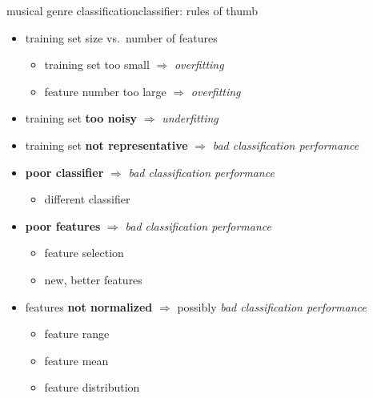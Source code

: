         \begin{frame}{musical genre classification}{classifier: rules of thumb}
            \begin{itemize}
                \item	training set size vs.\ number of features
                    \begin{itemize}
                        \item	training set too small $\Rightarrow$ \textit{overfitting}
                        \item	feature number too large $\Rightarrow$ \textit{overfitting}
                    \end{itemize}
                \item<2->	training set \textbf{too noisy} $\Rightarrow$ \textit{underfitting}
                \item<3->	training set \textbf{not representative} $\Rightarrow$ \textit{bad classification performance}
                \item<4->	\textbf{poor classifier} $\Rightarrow$ \textit{bad classification performance}
                    \begin{itemize}
                        \item	different classifier
                    \end{itemize}
                \item<5->	\textbf{poor features} $\Rightarrow$ \textit{bad classification performance}
                    \begin{itemize}
                        \item	feature selection
                        \item	new, better features
                    \end{itemize}
                \item<6->	features \textbf{not normalized} $\Rightarrow$ possibly \textit{bad classification performance}
                    \begin{itemize}
                        \item	feature range
                        \item	feature mean
                        \item	feature distribution
                    \end{itemize}
            \end{itemize}
        \end{frame}
